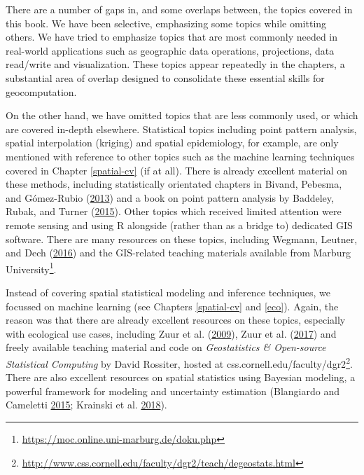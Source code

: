 \documentclass[]{krantz}
\let\rmarkdownfootnote\footnote%
\def\footnote{\protect\rmarkdownfootnote}
\renewcommand{\href}[2]{#2\footnote{\url{#1}}}
\begin{document}
There are a number of gaps in, and some overlaps between, the topics covered in this book.
We have been selective, emphasizing some topics while omitting others.
We have tried to emphasize topics that are most commonly needed in real-world applications such as geographic data operations, projections, data read/write and visualization.
These topics appear repeatedly in the chapters, a substantial area of overlap designed to consolidate these essential skills for geocomputation.

On the other hand, we have omitted topics that are less commonly used, or which are covered in-depth elsewhere.
Statistical topics including point pattern analysis, spatial interpolation (kriging) and spatial epidemiology, for example, are only mentioned with reference to other topics such as the machine learning techniques covered in Chapter \ref{spatial-cv} (if at all).
There is already excellent material on these methods, including statistically orientated chapters in Bivand, Pebesma, and Gómez-Rubio (\protect\hyperlink{ref-bivand_applied_2013}{2013}) and a book on point pattern analysis by Baddeley, Rubak, and Turner (\protect\hyperlink{ref-baddeley_spatial_2015}{2015}).
Other topics which received limited attention were remote sensing and using R alongside (rather than as a bridge to) dedicated GIS software.
There are many resources on these topics, including Wegmann, Leutner, and Dech (\protect\hyperlink{ref-wegmann_remote_2016}{2016}) and the GIS-related teaching materials available from \href{https://moc.online.uni-marburg.de/doku.php}{Marburg University}.

Instead of covering spatial statistical modeling and inference techniques, we focussed on machine learning (see Chapters \ref{spatial-cv} and \ref{eco}).
Again, the reason was that there are already excellent resources on these topics, especially with ecological use cases, including Zuur et al. (\protect\hyperlink{ref-zuur_mixed_2009}{2009}), Zuur et al. (\protect\hyperlink{ref-zuur_beginners_2017}{2017}) and freely available teaching material and code on \emph{Geostatistics \& Open-source Statistical Computing} by David Rossiter, hosted at \href{http://www.css.cornell.edu/faculty/dgr2/teach/degeostats.html}{css.cornell.edu/faculty/dgr2}.
There are also excellent resources on spatial statistics using Bayesian modeling, a powerful framework for modeling and uncertainty estimation (Blangiardo and Cameletti \protect\hyperlink{ref-blangiardo_spatial_2015}{2015}; Krainski et al. \protect\hyperlink{ref-krainski_advanced_2018}{2018}).
\end{document}
